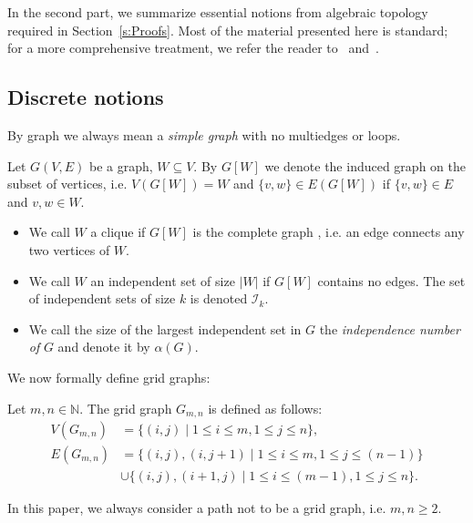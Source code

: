 \documentclass[a4paper, v2021]{lipics-v2021}
\theoremstyle{plain}
\theoremstyle{definition}
\begin{document}
In the second part, we summarize essential notions from algebraic topology required in Section~\ref{s:Proofs}. Most of the material presented here is standard; for a more comprehensive treatment, we refer the reader to~\cite{Jonsson08,Sti12, Hatcher2002,Kozlov2008CAT} and~\cite{matousek2003}.

\subsection*{Discrete notions}
By graph we always mean a \emph{simple graph} with no multiedges or loops.
\begin{definition}\label{d:graph}
Let $G(V,E)$ be a graph, $W \subseteq V$. By $G[W]$ we denote the induced graph on the subset of vertices, i.e. $V(G[W]) = W$ and $\{v,w\} \in E(G[W])$ if $\{v,w\}\in E$ and $v,w\in W$.
\begin{itemize}
    \item We call $W$ a clique if $G[W]$ is the complete graph , i.e. an edge connects any two vertices of $W$.
    \item We call $W$ an independent set of size $|W|$ if $G[W]$ contains no edges. The set of independent sets of size $k$ is denoted $\mathcal{I}_k$.
    \item We call the size of the largest independent set in $G$ the \emph{independence number of} $G$ and denote it by $\alpha(G)$.
\end{itemize}
\end{definition}

We now formally define grid graphs: 
\begin{definition}
    Let $m,n \in \mathbb{N}$. The grid graph $G_{m,n}$ is defined as follows: 
    \begin{align*}
    V(G_{m,n}) &= \{(i,j) \mid 1\leq i\leq m,  1\leq j\leq n \},\\    
    E(G_{m,n}) &= \{(i,j), (i,j+1) \mid 1\leq i\leq m,  1\leq j\leq (n-1) \}\\        
    &\cup \{(i,j), (i+1,j) \mid 1\leq i\leq (m-1),  1\leq j\leq n \}.
\end{align*}
\end{definition}
In this paper, we always consider a path not to be a grid graph, i.e. $m, n\geq2$.
\end{document}
